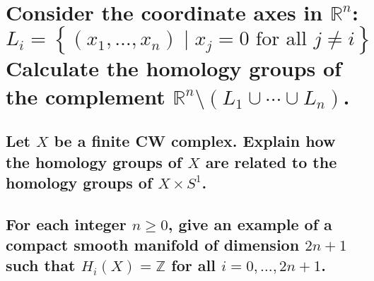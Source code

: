 \documentclass[10pt]{article}
\newcommand{\advsection}{\addtocounter{section}{1} \setcounter{subsection}{0}}
\begin{document}
\section{Consider the coordinate axes in $\mathbb{R}^n$:
  $$L_i = \left\{ (x_1, \dots, x_n) \mid x_j =0 \mbox{ for all } j \neq i \right\} $$
  Calculate the homology groups of the complement $\mathbb{R}^n \setminus (L_1 \cup \cdots \cup
  L_n)$.}

\advsection{}

\subsection{Let $X$ be a finite CW complex. Explain how the homology groups of $X$ are related to
  the homology groups of $X \times S^1$.}

\subsection{For each integer $n \geq 0$, give an example of a compact smooth manifold of dimension
  $2n +1$ such that $H_i(X) = \mathbb{Z}$ for all $i = 0,\dots, 2n+1$.}
\end{document}
